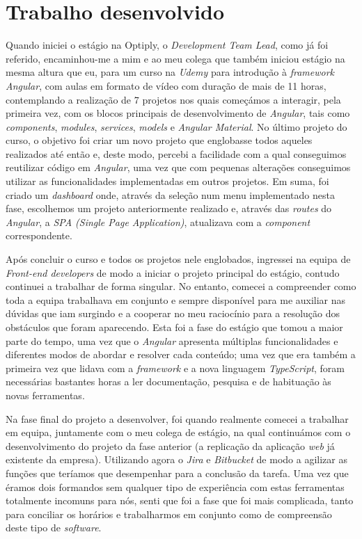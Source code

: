 \documentclass{article}
\begin{document}
\section{Trabalho desenvolvido}
\label{sec:trab-dev}
\hspace*{0.5cm} Quando iniciei o estágio na Optiply, o \emph{Development Team Lead}, como já foi referido, encaminhou-me a mim e ao meu colega que também iniciou estágio na mesma altura que eu, para um curso na \emph{Udemy} para introdução à \emph{framework Angular}, com aulas em formato de vídeo com duração de mais de 11 horas, contemplando a realização de 7 projetos nos quais começámos a interagir, pela primeira vez, com os blocos principais de desenvolvimento de \emph{Angular}, tais como \emph{components}, \emph{modules}, \emph{services}, \emph{models} e \emph{Angular Material}. No último projeto do curso, o objetivo foi criar um novo projeto que englobasse todos aqueles realizados até então e, deste modo, percebi a facilidade com a qual conseguimos reutilizar código em \emph{Angular}, uma vez que com pequenas alterações conseguimos utilizar as funcionalidades implementadas em outros projetos. Em suma, foi criado um \emph{dashboard} onde, através da seleção num menu implementado nesta fase, escolhemos um projeto anteriormente realizado e, através das \emph{routes} do \emph{Angular}, a \emph{SPA (Single Page Application)}, atualizava com a \emph{component} correspondente. \newline

\hspace*{0.5cm} Após concluir o curso e todos os projetos nele englobados, ingressei na equipa de \emph{Front-end developers} de modo a iniciar o projeto principal do estágio, contudo continuei a trabalhar de forma singular. No entanto, comecei a compreender como toda a equipa trabalhava em conjunto e sempre disponível para me auxiliar nas dúvidas que iam surgindo e a cooperar no meu raciocínio para a resolução dos obstáculos que foram aparecendo. Esta foi a fase do estágio que tomou a maior parte do tempo, uma vez que o \emph{Angular} apresenta múltiplas funcionalidades e diferentes modos de abordar e resolver cada conteúdo; uma vez que era também a primeira vez que lidava com a \emph{framework} e a nova linguagem \emph{TypeScript}, foram necessárias bastantes horas a ler documentação, pesquisa e de habituação às novas ferramentas. \newline

\hspace*{0.5cm} Na fase final do projeto a desenvolver, foi quando realmente comecei a trabalhar em equipa, juntamente com o meu colega de estágio, na qual continuámos com o desenvolvimento do projeto da fase anterior (a replicação da aplicação \emph{web} já existente da empresa). Utilizando agora o \emph{Jira} e \emph{Bitbucket} de modo a agilizar as funções que teríamos que desempenhar para a conclusão da tarefa. Uma vez que éramos dois formandos sem qualquer tipo de experiência com estas ferramentas totalmente incomuns para nós, senti que foi a fase que foi mais complicada, tanto para conciliar os horários e trabalharmos em conjunto como de compreensão deste tipo de \emph{software}. \newline
\end{document}
